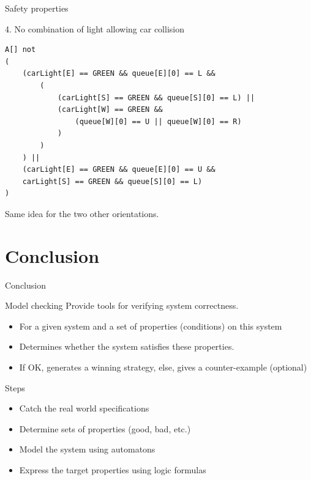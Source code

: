 \documentclass{bredelebeamer}
\begin{document}
\begin{frame}[fragile]{Safety properties}
\begin{block}{4. No combination of light allowing car collision}
\begin{verbatim}
A[] not 
(
    (carLight[E] == GREEN && queue[E][0] == L &&
        (
            (carLight[S] == GREEN && queue[S][0] == L) ||
            (carLight[W] == GREEN &&
                (queue[W][0] == U || queue[W][0] == R)
            )
        )
    ) || 
    (carLight[E] == GREEN && queue[E][0] == U &&
    carLight[S] == GREEN && queue[S][0] == L)
)
\end{verbatim}

Same idea for the two other orientations.
\end{block}
\end{frame}


\section{Conclusion}
\begin{frame}{Conclusion}

\begin{block}{Model checking}
Provide tools for verifying system correctness.
\begin{itemize}
\item For a given system and a set of properties (conditions) on this system
\item Determines whether the system satisfies these properties.
\item If OK, generates a winning strategy, else, gives a counter-example (optional)
\end{itemize}
\end{block}

\begin{block}{Steps}
\begin{itemize}
\item Catch the real world specifications
\item Determine sets of properties (good, bad, etc.)
\item Model the system using automatons
\item Express the target properties using logic formulas  

\end{itemize}

\end{block}

\end{frame}
\end{document}
